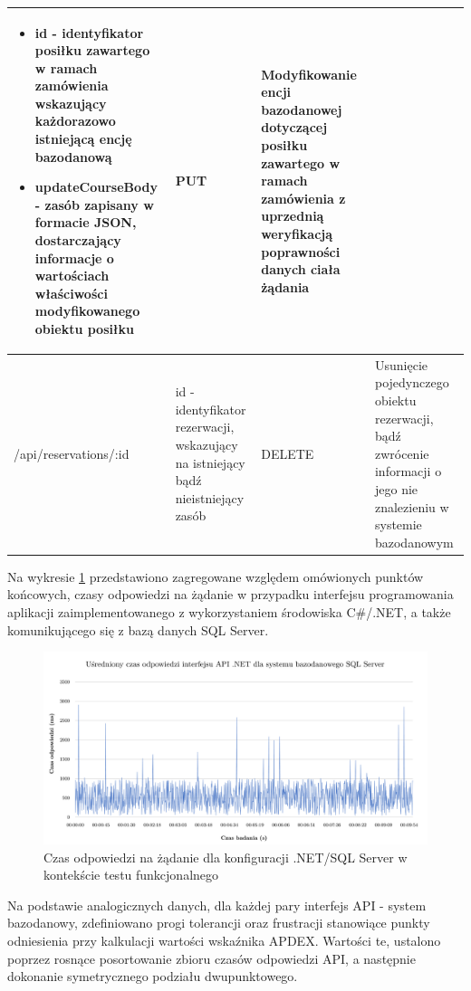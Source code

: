 \begin{table}[htbp]
\begin{tabularx}{\linewidth}{|X|X|X|X|}
\begin{itemize}
            \item id - identyfikator posiłku zawartego w ramach zamówienia wskazujący każdorazowo istniejącą encję bazodanową
            \item updateCourseBody - zasób zapisany w formacie JSON, dostarczający informacje o wartościach właściwości modyfikowanego obiektu posiłku
        \end{itemize}  &
        PUT &
        Modyfikowanie encji bazodanowej dotyczącej posiłku zawartego w ramach zamówienia z uprzednią weryfikacją poprawności danych ciała żądania \\ \hline
        /api/reservations/:id & id - identyfikator rezerwacji, wskazujący na istniejący bądź nieistniejący zasób & DELETE & Usunięcie pojedynczego obiektu rezerwacji, bądź zwrócenie informacji o jego nie znalezieniu w systemie bazodanowym \\ \hline
    \hline
    \end{tabularx}
\end{table}

Na wykresie \ref{fig:wykres-testy-funkcjonalne-dotnet} przedstawiono zagregowane względem omówionych punktów końcowych, czasy odpowiedzi na żądanie w przypadku interfejsu programowania aplikacji zaimplementowanego z wykorzystaniem środowiska C\#/.NET, a także komunikującego się z bazą danych SQL Server.

\begin{figure}[ht]
    \centering
     \includegraphics[width=\linewidth]{rys05/testy-funkcjonalne-dotnet.pdf}
    \caption{Czas odpowiedzi na żądanie dla konfiguracji .NET/SQL Server w kontekście testu funkcjonalnego}
    \label{fig:wykres-testy-funkcjonalne-dotnet}
\end{figure}

Na podstawie analogicznych danych, dla każdej pary interfejs API - system bazodanowy, zdefiniowano progi tolerancji oraz frustracji stanowiące punkty odniesienia przy kalkulacji wartości wskaźnika APDEX. Wartości te, ustalono poprzez rosnące posortowanie zbioru czasów odpowiedzi API, a następnie dokonanie symetrycznego podziału dwupunktowego.


